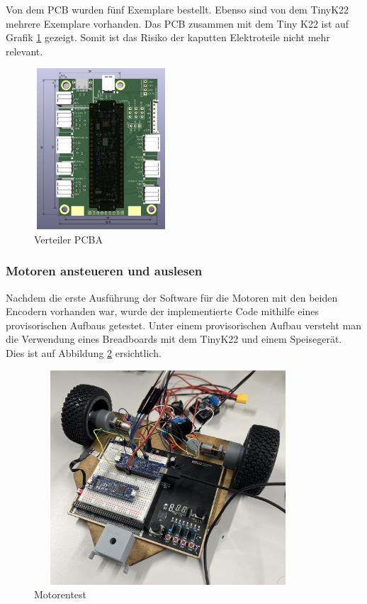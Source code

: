 Von dem PCB wurden fünf Exemplare bestellt. Ebenso sind von dem TinyK22 mehrere Exemplare vorhanden. Das PCB zusammen mit dem Tiny K22 ist auf Grafik \ref{fig: Verteiler PCBA} gezeigt. Somit ist das Risiko der kaputten Elektroteile nicht mehr relevant.

\begin{figure}[H]
\centering
\includegraphics[width=5cm, height=6cm]{assets/ET/PCB/VerteilerPCB_bestueckt.png}
\caption{Verteiler PCBA}
\label{fig: Verteiler PCBA}
\end{figure}


\subsubsection{Motoren ansteueren und auslesen}

Nachdem die erste Ausführung der Software für die Motoren mit den beiden Encodern vorhanden war, wurde der implementierte Code mithilfe eines provisorischen Aufbaus getestet. Unter einem provisorischen Aufbau versteht man die Verwendung eines Breadboards mit dem TinyK22 und einem Speisegerät. Dies ist auf Abbildung \ref{fig: Motorentest} ersichtlich.

\begin{figure}[H]
\centering
\includegraphics[width=10cm, height=8cm]{assets/ET/Motoren/Motorentest.jpeg}
\caption{Motorentest}
\label{fig: Motorentest}
\end{figure}


